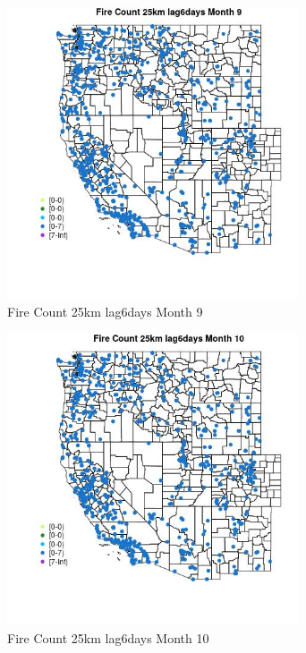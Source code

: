 \begin{figure} 
\centering  
\includegraphics[width=0.77\textwidth]{Code_Outputs/Report_ML_input_PM25_Step4_part_e_de_duplicated_aves_compiled_2019-05-21wNAs_MapObsMo9Fire_Count_25km_lag6days.jpg} 
\caption{\label{fig:Report_ML_input_PM25_Step4_part_e_de_duplicated_aves_compiled_2019-05-21wNAsMapObsMo9Fire_Count_25km_lag6days}Fire Count 25km lag6days Month 9} 
\end{figure} 
 

\clearpage 

\begin{figure} 
\centering  
\includegraphics[width=0.77\textwidth]{Code_Outputs/Report_ML_input_PM25_Step4_part_e_de_duplicated_aves_compiled_2019-05-21wNAs_MapObsMo10Fire_Count_25km_lag6days.jpg} 
\caption{\label{fig:Report_ML_input_PM25_Step4_part_e_de_duplicated_aves_compiled_2019-05-21wNAsMapObsMo10Fire_Count_25km_lag6days}Fire Count 25km lag6days Month 10} 
\end{figure} 
 

